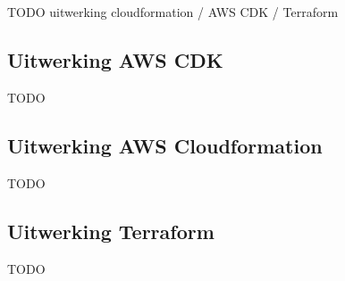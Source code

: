 
\chapter{}
\label{ch:uitwerking}


TODO uitwerking cloudformation / AWS CDK / Terraform

\section{Uitwerking AWS CDK}
\label{sec:uitwerking-cdk}

TODO

\section{Uitwerking AWS Cloudformation}
\label{sec:uitwerking-cloudformation}

TODO

\section{Uitwerking Terraform}
\label{sec:uitwerking-terraform}

TODO